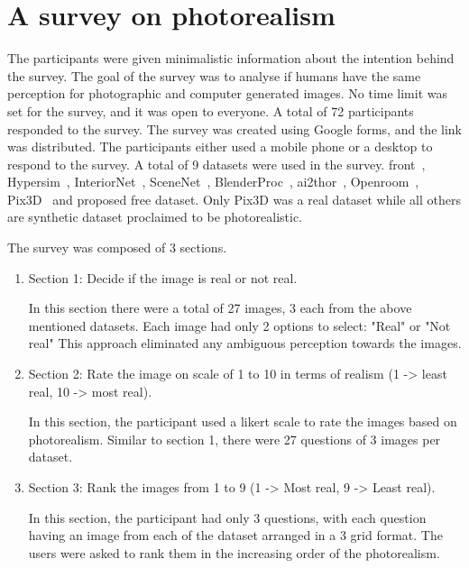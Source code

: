 \section{A survey on photorealism}\label{sec:a-survey-on-photorealism}
The participants were given minimalistic information about the intention behind the survey.
The goal of the survey was to analyse if humans have the same perception for photographic and computer generated images.
No time limit was set for the survey, and it was open to everyone.
A total of 72 participants responded to the survey.
The survey was created using Google forms, and the link was distributed.
The participants either used a mobile phone or a desktop to respond to the survey.
A total of 9 datasets were used in the survey.
\gls{front}~\cite{Fu20203DFRONT3F}, Hypersim~\cite{Roberts2020HypersimAP}, InteriorNet~\cite{InteriorNet18}, SceneNet~\cite{McCormac:etal:ICCV2017}, BlenderProc~\cite{denninger2019blenderproc},
\gls{ai2thor}~\cite{kolve2019ai2thor}, Openroom~\cite{li2021openrooms}, Pix3D~\cite{pix3d} and proposed \gls{free} dataset.
Only Pix3D was a real dataset while all others are synthetic dataset proclaimed to be photorealistic.

The survey was composed of 3 sections.
\begin{enumerate}
    \item Section 1: Decide if the image is real or not real.

    In this section there were a total of 27 images, 3 each from the above mentioned datasets.
    Each image had only 2 options to select: "Real" or "Not real"
    This approach eliminated any ambiguous perception towards the images.

    \item Section 2: Rate the image on scale of 1 to 10 in terms of realism (1 -> least real, 10 -> most real).

    In this section, the participant used a likert scale to rate the images based on photorealism.
    Similar to section 1, there were 27 questions of 3 images per dataset.

    \item Section 3: Rank the images from 1 to 9 (1 -> Most real, 9 -> Least real).

    In this section, the participant had only 3 questions, with each question having an image from each of the dataset arranged in a 3 grid format.
    The users were asked to rank them in the increasing order of the photorealism.
\end{enumerate}

